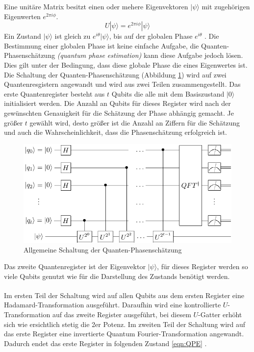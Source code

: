 Eine unit\"are Matrix besitzt einen oder mehere Eigenvektoren $|\psi\rangle$ mit zugeh\"origen Eigenwerten $e^{2\pi i \phi}$.
\begin{equation}
  U|\psi\rangle = e^{2\pi i \phi}|\psi\rangle
\end{equation}
Ein Zustand $|\psi\rangle$ ist gleich zu $e^{i\theta}|\psi\rangle$, bis auf der globalen Phase $e^{i\theta}$ \cite{nielsen_chuang_2010}. Die Bestimmung einer globalen Phase ist keine einfache Aufgabe, die Quanten-Phasensch\"atzung \textit{(quantum phase estimation)} kann diese Aufgabe jedoch l\"osen. Dies gilt unter der Bedingung, dass diese globale Phase die eines Eigenwertes ist. Die Schaltung der Quanten-Phasensch\"atzung (Abbildung \ref{fig:QPE}) wird auf zwei Quantenresgistern angewandt und wird aus zwei Teilen zusammengestellt. Das erste Quantenregister besteht aus $t$ Qubits die alle mit dem Basiszustand $|0\rangle$ initialisiert werden. Die Anzahl an Qubits f\"ur dieses Register wird nach der gew\"unschten Genauigkeit f\"ur die Sch\"atzung der Phase abh\"angig gemacht. Je gr\"o\ss er $t$ gew\"ahlt wird, desto gr\"o\ss er ist die Anzahl an Ziffern f\"ur die Sch\"atzung und auch die Wahrscheinlichkeit, dass die Phasensch\"atzung erfolgreich ist.
\begin{figure}[h]
  \centering
  \includegraphics[width=1\textwidth]{figures/QPE.pdf}
  \caption{Allgemeine Schaltung der Quanten-Phasensch\"atzung}
  \label{fig:QPE}
\end{figure}
Das zweite Quantenregister ist der Eigenvektor $|\psi\rangle$, f\"ur dieses Register werden so viele Qubits genutzt wie f\"ur die Darstellung des Zustands ben\"otigt werden.\\\\
Im ersten Teil der Schaltung wird auf allen Qubits aus dem ersten Register eine Hadamard-Transformation ausgef\"uhrt. Daraufhin wird eine kontrollierte $U$-Transformation auf das zweite Register ausgef\"uhrt, bei diesem $U$-Gatter erh\"oht sich wie ersichtlich stetig die 2er Potenz. Im zweiten Teil der Schaltung wird auf das erste Register eine invertierte Quantum Fourier-Transformation angewandt. Dadurch endet das erste Register in folgenden Zustand \ref{eqn:QPE} \cite{nielsen_chuang_2010}.
